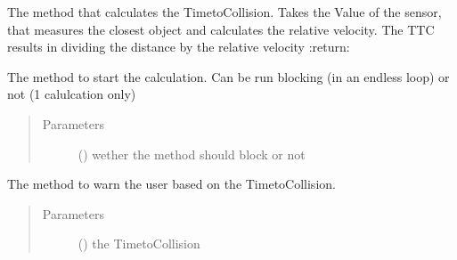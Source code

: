 \documentclass[letterpaper,10pt,english]{sphinxmanual}
\begin{document}
\begin{fulllineitems}
\begin{fulllineitems}
\label{\detokenize{no_collide:lib.nocollide.NoCollide.calc}}
The method that calculates the Time\sphinxhyphen{}to\sphinxhyphen{}Collision. Takes the Value of the sensor, that measures the closest object
and calculates the relative velocity. The TTC results in dividing the distance by the relative velocity
:return:

\end{fulllineitems}


\begin{fulllineitems}
\label{\detokenize{no_collide:lib.nocollide.NoCollide.run}}
The method to start the calculation. Can be run blocking (in an endless loop) or not (1 calulcation only)
\begin{quote}\begin{description}
\item[{Parameters}] \leavevmode
{} () \textendash{} wether the method should block or not

\end{description}\end{quote}

\end{fulllineitems}


\begin{fulllineitems}
\label{\detokenize{no_collide:lib.nocollide.NoCollide.warn}}
The method to warn the user based on the Time\sphinxhyphen{}to\sphinxhyphen{}Collision.
\begin{quote}\begin{description}
\item[{Parameters}] \leavevmode
{} () \textendash{} the Time\sphinxhyphen{}to\sphinxhyphen{}Collision

\end{description}\end{quote}

\end{fulllineitems}


\end{fulllineitems}
\end{document}

